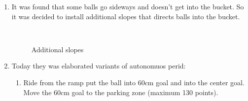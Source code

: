 \begin{enumerate}
\begin{enumerate}
		\item It was found that some balls go sideways and doesn't get into the bucket. So it was decided to install additional slopes that directs balls into the bucket.
		\begin{figure}[H]
			\begin{minipage}[h]{0.2\linewidth}
				\center  
			\end{minipage}
			\begin{minipage}[h]{0.6\linewidth}
				\caption{Additional slopes}
			\end{minipage}
		\end{figure}
		
        \item Today they was elaborated variants of autonomuos perid:
        \begin{enumerate}
        	
        	\item Ride from the ramp put the ball into 60cm goal and into the center goal. Move the 60cm goal to the parking zone (maximum 130 points).
        	

\end{enumerate}
\end{enumerate}
\end{enumerate}

